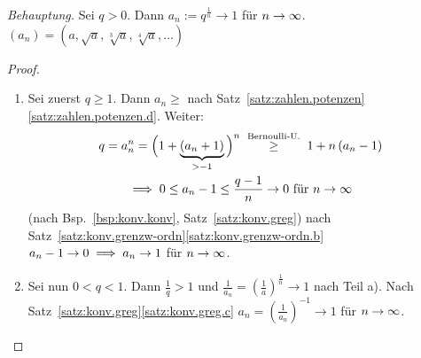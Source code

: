 \documentclass[12pt]{scrreprt}
\begin{document}
\begin{bsp}
\label{bsp:konv.kte-wurzel}
\emph{Behauptung.}
Sei $q>0$. Dann $a_n := q^{\frac{1}{n}}\to1$ für $n\rightarrow\infty$.\\$(a_n)=(a, \sqrt{a}, \sqrt[3]{a}, \sqrt[4]{a}, \dotsc)$
\begin{proof}
\begin{enumerate}
\item Sei zuerst $q\ge1$. Dann $a_n\ge$ nach Satz~\ref{satz:zahlen.potenzen}\ref{satz:zahlen.potenzen.d}. Weiter:
\begin{gather*}
q=a_n^n=\Big(1+\underbrace{\left(a_n+1\right)}_{>-1}\Big)^n \nach{\ge}{Bernoulli-U.} 1+n\left(a_n-1\right)\\
\folgt 0\le a_n-1 \le \frac{q-1}{n} \to 0\text{ für }\ninf
\end{gather*}
 (nach Bsp.~\ref{bsp:konv.konv}, Satz~\ref{satz:konv.greg}) \folgt nach Satz~\ref{satz:konv.grenzw-ordn}\ref{satz:konv.grenzw-ordn.b} $a_n-1\to0 \implies a_n\to1$ für $n\rightarrow\infty$.\\
\item Sei nun $0<q<1$. Dann $\frac1q>1$ und $\frac{1}{a_n}=\left(\frac1a\right)^\frac1n\to1$ nach Teil a). Nach Satz~\ref{satz:konv.greg}\ref{satz:konv.greg.c} \folgt $a_n=\left(\frac{1}{a_n}\right)^{-1}\to1$ für $n\rightarrow\infty$.
\end{enumerate}
\end{proof}
\end{bsp}
\end{document}

